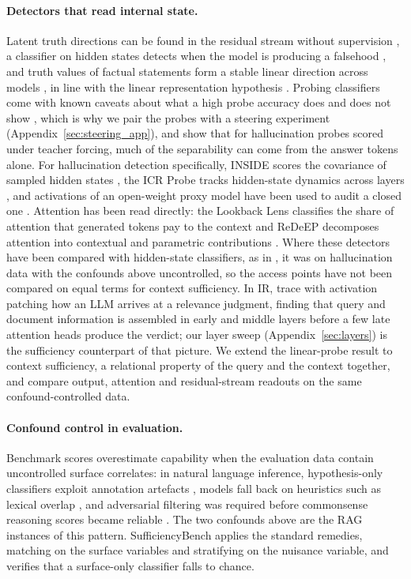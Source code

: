 \documentclass[acmsmall,screen,review]{acmart}
\newcommand{\bench}{SufficiencyBench}
\begin{document}
\paragraph{Detectors that read internal state.}
Latent truth directions can be found in the residual stream without supervision \citep{burns2023discovering}, a classifier on hidden states detects when the model is producing a falsehood \citep{azaria2023internal}, and truth values of factual statements form a stable linear direction across models \citep{marks2024geometry}, in line with the linear representation hypothesis \citep{park2024linear}. Probing classifiers come with known caveats about what a high probe accuracy does and does not show \citep{belinkov2022probing}, which is why we pair the probes with a steering experiment (Appendix~\ref{sec:steering_app}), and \citet{magata2026answeronly} show that for hallucination probes scored under teacher forcing, much of the separability can come from the answer tokens alone. For hallucination detection specifically, INSIDE scores the covariance of sampled hidden states \citep{chen2024inside}, the ICR Probe tracks hidden-state dynamics across layers \citep{zhang2025icrprobe}, and activations of an open-weight proxy model have been used to audit a closed one \citep{singh2026proxyanalyzer}. Attention has been read directly: the Lookback Lens classifies the share of attention that generated tokens pay to the context \citep{chuang2024lookback} and ReDeEP decomposes attention into contextual and parametric contributions \citep{sun2025redeep}. Where these detectors have been compared with hidden-state classifiers, as in \citet{chuang2024lookback}, it was on hallucination data with the confounds above uncontrolled, so the access points have not been compared on equal terms for context sufficiency. In IR, \citet{liu2026how} trace with activation patching how an LLM arrives at a relevance judgment, finding that query and document information is assembled in early and middle layers before a few late attention heads produce the verdict; our layer sweep (Appendix~\ref{sec:layers}) is the sufficiency counterpart of that picture. We extend the linear-probe result to context sufficiency, a relational property of the query and the context together, and compare output, attention and residual-stream readouts on the same confound-controlled data.

\paragraph{Confound control in evaluation.}
Benchmark scores overestimate capability when the evaluation data contain uncontrolled surface correlates: in natural language inference, hypothesis-only classifiers exploit annotation artefacts \citep{gururangan2018annotation}, models fall back on heuristics such as lexical overlap \citep{mccoy2019right}, and adversarial filtering was required before commonsense reasoning scores became reliable \citep{sakaguchi2020winogrande}. The two confounds above are the RAG instances of this pattern. \bench{} applies the standard remedies, matching on the surface variables and stratifying on the nuisance variable, and verifies that a surface-only classifier falls to chance.
\end{document}
